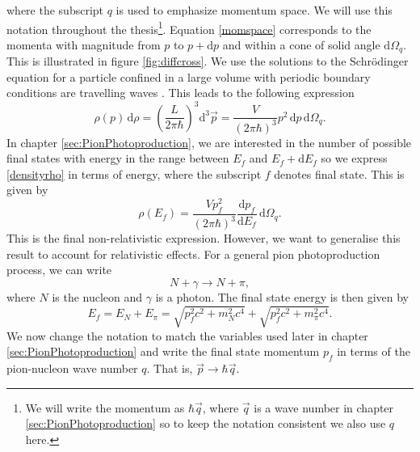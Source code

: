 where the subscript $q$ is used to emphasize momentum space. We will use this notation throughout the thesis\footnote{We will write the momentum as $\hbar \vec{q}$, where $\vec{q}$ is a wave number in chapter \ref{sec:PionPhotoproduction} so to keep the notation consistent we also use $q$ here. }. Equation \eqref{momspace} corresponds to the momenta with magnitude from $p$ to $p+\text{d}p$ and within a cone of solid angle $\text{d}\Omega_q$. This is illustrated in figure \ref{fig:diffcross}. We use the solutions to the Schrödinger equation for a particle confined in a large volume with periodic boundary conditions are travelling waves \cite{Kernebog}. This leads to the following expression
\begin{equation} \label{densityrho}
	\rho(p) \, \text{d}\rho = \left( \frac{L}{2\pi\hbar}\right)^3 \text{d}^3 \vec{p} = \frac{V}{(2\pi\hbar)^3} p^2 \, \text{d}p \, \text{d}\Omega_q.
\end{equation}
In chapter \ref{sec:PionPhotoproduction}, we are interested in the number of possible final states with energy in the range between $E_f$ and $E_f + \text{d}E_f$ so we express \eqref{densityrho} in terms of energy, where the subscript $f$ denotes final state. This is given by \cite{Kernebog}
\begin{equation} \label{densityenergy}
	\rho(E_f) = \frac{V p_f^2}{(2\pi \hbar)^3} \frac{\text{d}p_f}{\text{d}E_f} \, \text{d}\Omega_q.
\end{equation}
This is the final non-relativistic expression. However, we want to generalise this result to account for relativistic effects. For a general pion photoproduction process, we can write
\begin{equation} \label{twobody}
	N + \gamma \rightarrow N+\pi,
\end{equation}
where $N$ is the nucleon and $\gamma$ is a photon. The final state energy \cite{Kernebog} is then given by
\begin{equation} \label{Ef}
	E_f = E_N + E_\pi = \sqrt{p_f^2 c^2 +m_N^2c^4} + \sqrt{p_f^2c^2 + m^2_\pi c^4}.
\end{equation}
We now change the notation to match the variables used later in chapter \ref{sec:PionPhotoproduction} and write the final state momentum $p_f$ in terms of the pion-nucleon wave number $q$. That is, $\vec{p}\rightarrow \hbar \vec{q}$. 

